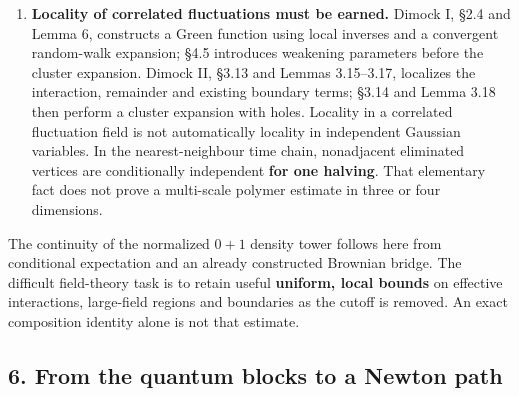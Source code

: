 \documentclass[11pt,a4paper]{article}
\begin{document}
\begin{enumerate}
  (172)--(175), introduces characteristic functions for the small-field
  analysis. Dimock II, introduction and §3.3, restores the full
  expansion by summing over histories of regions; its Theorem 3.1
  includes large-field and boundary terms and normalization, under its
  stated block-size, mass and running-coupling conditions and with the
  energy and mass counterterms selected in Part I. The elementary
  identity \(\prod_b[\chi_b+(1-\chi_b)]=1\) illustrates why every
  pattern of good and bad blocks is retained. Dimock's good-region tests
  involve fields, derivatives and nested regions; they are not identical
  to a bound on one midpoint fluctuation. In the one-cell law, strong
  convexity yields the normalized bound \[
   \mathbb P(|Z-z_*|\ge r\mid\hbox{retained endpoints})
      \le 2e^{-\kappa r^2/(2\hbar)},\tag{14}
  \] provided the conditional potential has second derivative at least
  \(\kappa>0\). The integration over its complement is controlled, not
  deleted.
\item
  \textbf{Locality of correlated fluctuations must be earned.} Dimock I,
  §2.4 and Lemma 6, constructs a Green function using local inverses and
  a convergent random-walk expansion; §4.5 introduces weakening
  parameters before the cluster expansion. Dimock II, §3.13 and Lemmas
  3.15--3.17, localizes the interaction, remainder and existing boundary
  terms; §3.14 and Lemma 3.18 then perform a cluster expansion with
  holes. Locality in a correlated fluctuation field is not automatically
  locality in independent Gaussian variables. In the nearest-neighbour
  time chain, nonadjacent eliminated vertices are conditionally
  independent \textbf{for one halving}. That elementary fact does not
  prove a multi-scale polymer estimate in three or four dimensions.
\end{enumerate}

The continuity of the normalized \(0+1\) density tower follows here from
conditional expectation and an already constructed Brownian bridge. The
difficult field-theory task is to retain useful \textbf{uniform, local
bounds} on effective interactions, large-field regions and boundaries as
the cutoff is removed. An exact composition identity alone is not that
estimate.

\hypertarget{from-the-quantum-blocks-to-a-newton-path}{%
\subsection{6. From the quantum blocks to a Newton
path}\label{from-the-quantum-blocks-to-a-newton-path}}
\end{document}
